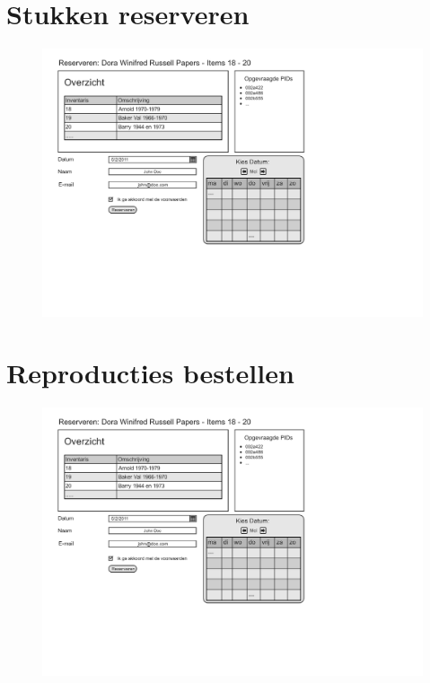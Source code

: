 \documentclass[a4paper,titlepage]{report}
\makeatletter
\def\namedlabel#1#2{
  \label{#1}
  \begingroup
   \def\@currentlabel{#2}%
   \label{#1:name}\endgroup
}
\makeatother
\begin{document}
\section{Stukken reserveren}
\namedlabel{ui:reserveer}{Stukken reserveren}
\begin{figure}[H]
  \includegraphics[totalheight=150mm,angle=90,page=1]{ui.pdf}
\end{figure}

\section{Reproducties bestellen}
\namedlabel{ui:bestel}{Reproducties bestellen}
\begin{figure}[H]
  \includegraphics[totalheight=150mm,angle=90,page=2]{ui.pdf}
\end{figure}
\end{document}

